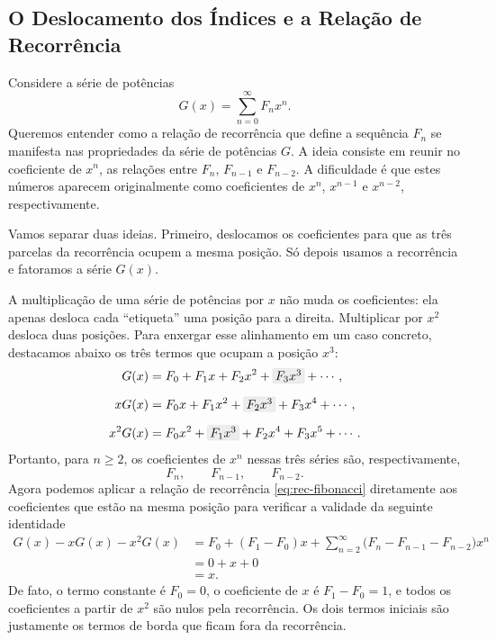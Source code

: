 \documentclass[12pt,portuguese]{article}
\theoremstyle{definition}
\theoremstyle{plainexercise}
\theoremstyle{starredexercise}
\theoremstyle{definition}
\begin{document}
\subsection{O Deslocamento dos Índices e a Relação de Recorrência}
\label{sec:fibonacci-equacao-geradora}

Considere a série de potências
\[
G(x)=\sum_{n=0}^{\infty}F_nx^n.
\]
Queremos entender como a relação de recorrência
que define a sequência $F_n$ se manifesta nas propriedades da série de potências $G$. 
A ideia consiste em reunir no coeficiente de $x^n$, 
as relações entre $F_n$, $F_{n-1}$ e $F_{n-2}$. A dificuldade é que estes números aparecem
originalmente como coeficientes de $x^n$, $x^{n-1}$ e $x^{n-2}$, 
respectivamente.

Vamos separar duas ideias. Primeiro, deslocamos os coeficientes para que
as três parcelas da recorrência ocupem a mesma posição. Só depois usamos a
recorrência e fatoramos a série $G(x)$.

A multiplicação de uma série de potências por $x$ não muda os
coeficientes: ela apenas desloca cada ``etiqueta'' uma posição para a
direita. Multiplicar por $x^2$ desloca duas posições. Para enxergar esse
alinhamento em um caso concreto, destacamos abaixo os três termos que ocupam
a posição $x^3$:
\newcommand{\termoemfoco}[1]{%
  \tikz[baseline=(termo.base)]{%
    \node[
      fill=gray!20,
      fill opacity=0.65,
      text opacity=1,
      draw=gray!35,
      line width=0.25pt,
      rounded corners=1pt,
      inner xsep=2pt,
      inner ysep=1pt
    ] (termo) {$#1$};%
  }%
}
\[
\begin{aligned}
G(x)&=F_0+F_1x+F_2x^2+\termoemfoco{F_3x^3}+\cdots,\\[0.2cm]
xG(x)&=F_0x+F_1x^2+\termoemfoco{F_2x^3}+F_3x^4+\cdots,\\[0.2cm]
x^2G(x)&=F_0x^2+\termoemfoco{F_1x^3}+F_2x^4+F_3x^5+\cdots.
\end{aligned}
\]
Portanto, para $n\geqslant2$, os coeficientes de $x^n$ nessas três
séries são, respectivamente,
\[
F_n,\qquad F_{n-1},\qquad F_{n-2}.
\]
Agora podemos aplicar a relação de recorrência
\eqref{eq:rec-fibonacci} diretamente aos coeficientes que estão na mesma
posição para verificar a validade da seguinte identidade
\begin{align*}
G(x)-xG(x)-x^2G(x)
&=F_0+(F_1-F_0)x +\sum_{n=2}^{\infty}
\bigl(F_n-F_{n-1}-F_{n-2}\bigr)x^n\\[0.3cm]
&=0+x+0
\\[0.2cm]
&=x.
\end{align*}
De fato, o termo constante é $F_0=0$, o coeficiente de $x$ é
$F_1-F_0=1$, e todos os coeficientes a partir de $x^2$ são nulos pela
recorrência. Os dois termos iniciais são justamente os termos de borda que
ficam fora da recorrência.
\end{document}
